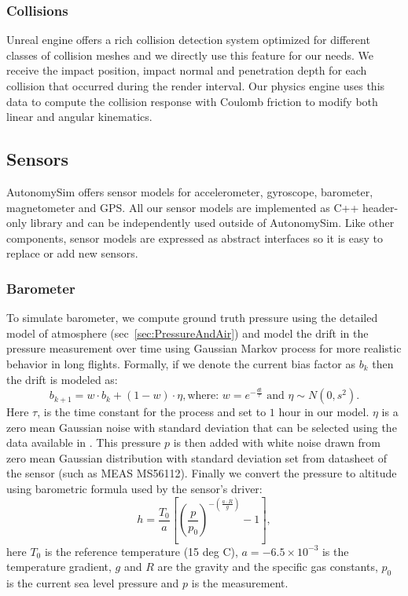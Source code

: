\documentclass[graybox]{svmult}
\begin{document}
	\subsubsection{Collisions}
	Unreal engine offers a rich collision detection system optimized for different classes of collision meshes and we directly use this feature for our needs. We receive the impact position, impact normal and penetration depth for each collision that occurred during the render interval. Our physics engine uses this data to compute the collision response with Coulomb friction to modify both linear and angular kinematics.\cite{hecker1997physics}
	
	\subsection{Sensors}
	AutonomySim offers sensor models for accelerometer, gyroscope, barometer, magnetometer and GPS. All our sensor models are implemented as C++ header-only library and can be independently used outside of AutonomySim. Like other components, sensor models are expressed as abstract interfaces so it is easy to replace or add new sensors.
	
	\subsubsection{Barometer}
	To simulate barometer, we compute ground truth pressure using the detailed model of atmosphere (sec~\ref{sec:PressureAndAir}) and model the drift in the pressure measurement over time using Gaussian Markov process \cite{sabatini2013stochastic} for more realistic behavior in long flights. Formally, if we denote the current bias factor as $b_k$ then the drift is modeled as:
	\begin{equation*}
	b_{k+1} = w\cdot b_k + (1-w)\cdot\eta, \mbox{where: } w = e^{- \frac{dt}{\tau}} \mbox{ and } \eta\sim N(0,s^2).
	\end{equation*}
	Here $\tau$, is the time constant for the process and set to $1$ hour in our model. $\eta$ is a zero mean Gaussian noise with standard deviation that can be selected using the data available in \cite{Burch2014}. This pressure $p$ is then added with white noise drawn from zero mean Gaussian distribution with standard deviation set from datasheet of the sensor (such as MEAS MS56112). Finally we convert the pressure to altitude using barometric formula used by the sensor's driver:
	\begin{equation*}
	h = \frac{T_{0}}{a} \left[\left(\frac{p}{p_{0}}\right)^{-(\frac{a \cdot R}{g})} - 1 \right],
	\end{equation*}
	here $T_{0}$ is the reference temperature (15 deg C), $a = -6.5 \times 10^{-3}$ is the temperature gradient, $g$ and $R$ are the gravity and the specific gas constants, $p_{0}$ is the current sea level pressure and $p$ is the measurement.
	
\end{document}
